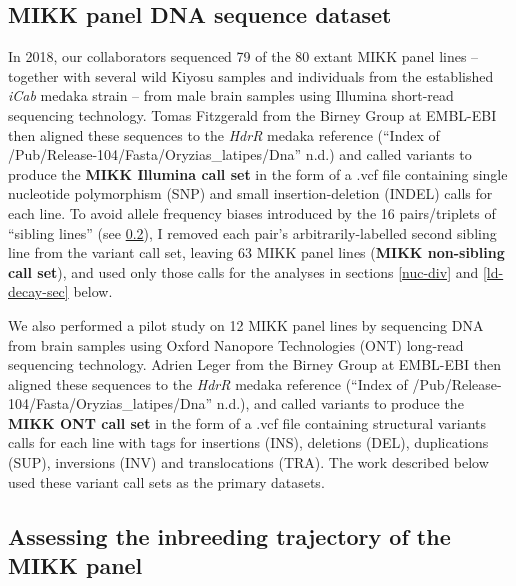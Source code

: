 \documentclass[
]{book}
\begin{document}
\hypertarget{non-sib-calls}{%
\subsection{MIKK panel DNA sequence dataset}\label{non-sib-calls}}

In 2018, our collaborators sequenced 79 of the 80 extant MIKK panel lines -- together with several wild Kiyosu samples and individuals from the established \emph{iCab} medaka strain -- from male brain samples using Illumina short-read sequencing technology. Tomas Fitzgerald from the Birney Group at EMBL-EBI then aligned these sequences to the \emph{HdrR} medaka reference ({``Index of /Pub/Release-104/Fasta/Oryzias\_latipes/Dna''} n.d.) and called variants to produce the \textbf{MIKK Illumina call set} in the form of a .vcf file containing single nucleotide polymorphism (SNP) and small insertion-deletion (INDEL) calls for each line. To avoid allele frequency biases introduced by the 16 pairs/triplets of ``sibling lines'' (see \ref{inbreeding-sec}), I removed each pair's arbitrarily-labelled second sibling line from the variant call set, leaving 63 MIKK panel lines (\textbf{MIKK non-sibling call set}), and used only those calls for the analyses in sections \ref{nuc-div} and \ref{ld-decay-sec} below.

We also performed a pilot study on 12 MIKK panel lines by sequencing DNA from brain samples using Oxford Nanopore Technologies (ONT) long-read sequencing technology. Adrien Leger from the Birney Group at EMBL-EBI then aligned these sequences to the \emph{HdrR} medaka reference ({``Index of /Pub/Release-104/Fasta/Oryzias\_latipes/Dna''} n.d.), and called variants to produce the \textbf{MIKK ONT call set} in the form of a .vcf file containing structural variants calls for each line with tags for insertions (INS), deletions (DEL), duplications (SUP), inversions (INV) and translocations (TRA). The work described below used these variant call sets as the primary datasets.

\hypertarget{inbreeding-sec}{%
\subsection{Assessing the inbreeding trajectory of the MIKK panel}\label{inbreeding-sec}}
\end{document}
